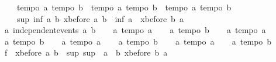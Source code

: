 \begin{isabellebody}
\ \ \ \ {\isasymlbrakk}tempo{}\ a{\isacharsemicolon}\ tempo{}\ b{\isasymrbrakk}\ {\isasymLongrightarrow}\ {\isasymlbrakk}tempo{}\ a{\isacharsemicolon}\ tempo{}\ b{\isasymrbrakk}\ {\isasymLongrightarrow}\ {\isasymlbrakk}tempo{}\ a{\isacharsemicolon}\ tempo{}\ b{\isasymrbrakk}\ {\isasymLongrightarrow}\isanewline
\ \ \ \ sup\ {\isacharparenleft}inf\ a\ {\isacharparenleft}{\isacharminus}b{\isacharparenright}{\isacharparenright}\ {\isacharparenleft}xbefore\ a\ b{\isacharparenright}\ {\isacharequal}\ inf\ a\ {\isacharparenleft}{\isacharminus}\ {\isacharparenleft}xbefore\ b\ a{\isacharparenright}{\isacharparenright}{\isachardoublequoteclose}\isanewline
%
\isadelimproof
%
\endisadelimproof
%
\isatagproof
{}\isamarkupfalse%
\ {\isacharminus}\isanewline
\ \ \isamarkupfalse%
\ a{}{\isacharcolon}\ {\isachardoublequoteopen}independent{\isacharunderscore}events\ a\ b{\isachardoublequoteclose}\isanewline
\ \ \isamarkupfalse%
\ a{}{\isacharcolon}\ {\isachardoublequoteopen}tempo{}\ a{\isachardoublequoteclose}\isanewline
\ \ \isamarkupfalse%
\ a{}{\isacharcolon}\ {\isachardoublequoteopen}tempo{}\ b{\isachardoublequoteclose}\isanewline
\ \ \isamarkupfalse%
\ a{}{\isacharcolon}\ {\isachardoublequoteopen}tempo{}\ a{\isachardoublequoteclose}\isanewline
\ \ \isamarkupfalse%
\ a{}{\isacharcolon}\ {\isachardoublequoteopen}tempo{}\ b{\isachardoublequoteclose}\isanewline
\ \ \isamarkupfalse%
\ a{}{\isacharcolon}\ {\isachardoublequoteopen}tempo{}\ a{\isachardoublequoteclose}\isanewline
\ \ \isamarkupfalse%
\ a{}{\isacharcolon}\ {\isachardoublequoteopen}tempo{}\ b{\isachardoublequoteclose}\isanewline
\ \ \isamarkupfalse%
\ a{}{\isacharcolon}\ {\isachardoublequoteopen}tempo{}\ a{\isachardoublequoteclose}\isanewline
\ \ \isamarkupfalse%
\ a{}{\isacharcolon}\ {\isachardoublequoteopen}tempo{}\ b{\isachardoublequoteclose}\isanewline
\ \ \isamarkupfalse%
\ \isamarkupfalse%
\ f{}{}{\isacharcolon}\ {\isachardoublequoteopen}{\isacharminus}\ xbefore\ a\ b\ {\isacharequal}\ sup\ {\isacharparenleft}sup\ {\isacharparenleft}{\isacharminus}\ a{\isacharparenright}\ {\isacharparenleft}{\isacharminus}\ b{\isacharparenright}{\isacharparenright}\ {\isacharparenleft}xbefore\ b\ a{\isacharparenright}{\isachardoublequoteclose}\isanewline

\end{isabellebody}
